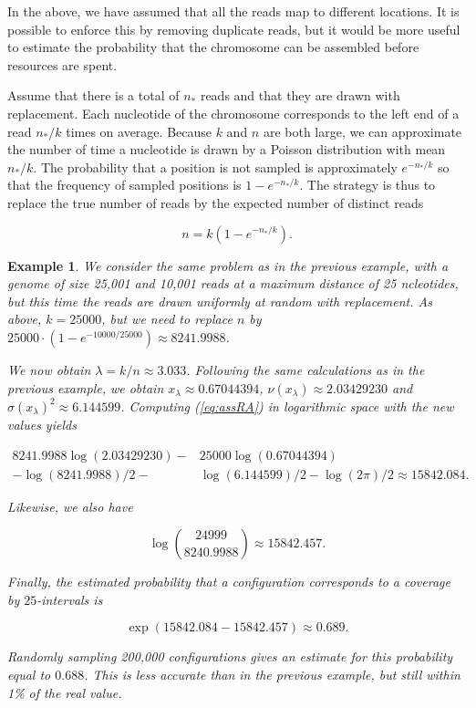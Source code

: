 \documentclass{article}
\newtheorem{example}{Example}
\begin{document}
In the above, we have assumed that all the reads map to different
locations. It is possible to enforce this by removing duplicate reads, but
it would be more useful to estimate the probability that the chromosome
can be assembled before resources are spent. 

Assume that there is a total of $n_*$ reads and that they are drawn with
replacement. Each nucleotide of the chromosome corresponds to the left end
of a read $n_*/k$ times on average. Because $k$ and $n$ are both large, we
can approximate the number of time a nucleotide is drawn by a Poisson
distribution with mean $n_*/k$. The probability that a position is not
sampled is approximately $e^{-n_*/k}$ so that the frequency of sampled
positions is $1-e^{-n_*/k}$. The strategy is thus to replace the true
number of reads by the expected number of distinct reads

\begin{equation}
\label{eq:nstar}
n = k(1-e^{-n_*/k}).
\end{equation}


\begin{example}
We consider the same problem as in the previous example, with a genome of
size 25,001 and 10,001 reads at a maximum distance of 25 ncleotides, but
this time the reads are drawn uniformly at random with replacement. As
above, $k=25000$, but we need to replace $n$ by $25000 \cdot
(1-e^{-10000/25000}) \approx 8241.9988$.

We now obtain $\lambda = k/n \approx 3.033$. Following the same
calculations as in the previous example, we obtain $x_\lambda \approx
0.67044394$, $\nu(x_\lambda) \approx 2.03429230$ and
$\sigma(x_\lambda)^2 \approx 6.144599$. Computing (\ref{eq:assRA}) in
logarithmic space with the new values yields

\begin{equation*}
\begin{split}
8241.9988\log(2.03429230) - &25000\log(0.67044394) \\
- \log(8241.9988)/2 - &\log(6.144599)/2 - \log(2\pi)/2
\approx 15842.084.
\end{split}
\end{equation*}

Likewise, we also have

\begin{equation*}
\log { 24999 \choose 8240.9988 } \approx 15842.457.
\end{equation*}

Finally, the estimated probability that a configuration corresponds to a
coverage by $25$-intervals is

\begin{equation*}
\exp(15842.084-15842.457) \approx 0.689.
\end{equation*}

Randomly sampling 200,000 configurations gives an estimate for this
probability equal to $0.688$. This is less accurate than in the previous
example, but still within 1\% of the real value.
\end{example}
\end{document}
